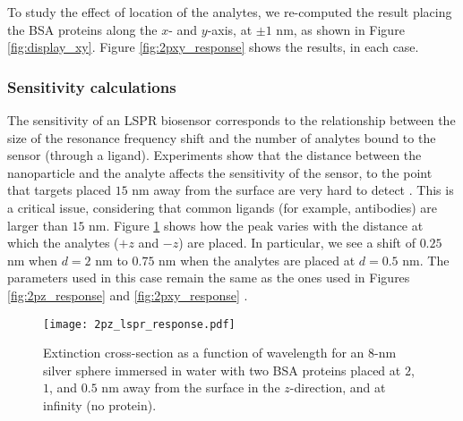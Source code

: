 To study the effect of location of the analytes, we re-computed the result placing the 
BSA proteins along the $x$- and $y$-axis, at $\pm 1$ nm, as shown in Figure \ref{fig:display_xy}.
Figure \ref{fig:2pxy_response} shows the results, in each case. 



\subsubsection{Sensitivity calculations} \label{sec:bsa_sensitivity}

The sensitivity of an LSPR biosensor corresponds to the relationship between the size 
of the resonance frequency shift and the number of analytes bound to the sensor (through a ligand).
Experiments show that the distance between the nanoparticle and the analyte 
affects the sensitivity of the sensor, to the point that
targets placed $15$ nm away from the surface are very hard to detect \cite{HaesETal2004}.
This is a critical issue, considering that common ligands (for example, antibodies) are
larger than $15$ nm. Figure \ref{fig:dist_response} 
shows how the peak varies with the distance at which the analytes ($+z$ and $-z$) are placed.  
In particular, we see a shift of $0.25$ nm when $d=2$ nm to $0.75$ nm when the 
analytes are placed at $d=0.5$ nm. The parameters used in this case remain 
the same as the ones used in Figures \ref{fig:2pz_response} and \ref{fig:2pxy_response} .


\begin{figure}%
   \centering
   \texttt{[image: 2pz\_lspr\_response.pdf]} 
   \caption{Extinction cross-section as a function of wavelength for an $8$-nm
            silver sphere immersed in water with two BSA proteins placed at
            $2$, $1$, and $0.5$ nm away from the surface in the 
            $z$-direction, and at infinity (no protein).}
   \label{fig:dist_response}
\end{figure}




\begin{figure*}
   \centering
    \\
%
\vspace{-0.5cm}
    \caption{Sensor protein display: BSA located at $\pm 1$ nm of the nanoparticle in the
           $x$-direction (top) and $y$-direction (bottom). Figure, plotting script and auxiliary files available under \textsc{cc-by} \cite{ClementiETal2018e}.}
    \label{fig:display_xy}
\end{figure*}


